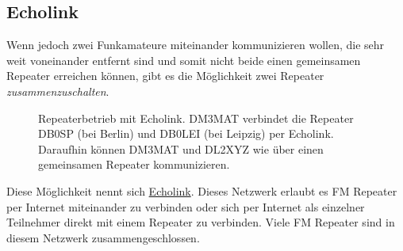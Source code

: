 \subsection{Echolink} \label{sec:echolink} 
Wenn jedoch zwei Funkamateure miteinander kommunizieren wollen, die sehr weit voneinander entfernt sind und somit nicht beide einen gemeinsamen Repeater erreichen können, gibt es die Möglichkeit zwei Repeater \emph{zusammenzuschalten}. 

\begin{figure}[!ht]
 \centering
 \caption{Repeaterbetrieb mit Echolink. DM3MAT verbindet die Repeater DB0SP (bei Berlin) und DB0LEI (bei Leipzig) per Echolink. Daraufhin können DM3MAT und DL2XYZ wie über einen gemeinsamen Repeater kommunizieren.} \label{fig:echolink}
\end{figure}

Diese Möglichkeit nennt sich \href{http://www.echolink.org/}{Echolink}. Dieses Netzwerk erlaubt es FM Repeater per Internet miteinander zu verbinden oder sich per Internet als einzelner Teilnehmer direkt mit einem Repeater zu verbinden. Viele FM Repeater sind in diesem Netzwerk zusammengeschlossen. 

